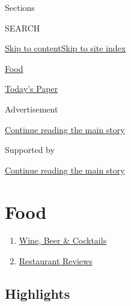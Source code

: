 Sections

SEARCH

\protect\hyperlink{site-content}{Skip to
content}\protect\hyperlink{site-index}{Skip to site index}

\href{https://www.nytimes3xbfgragh.onion/section/food}{Food}

\href{https://myaccount.nytimes3xbfgragh.onion/auth/login?response_type=cookie\&client_id=vi}{}

\href{https://www.nytimes3xbfgragh.onion/section/todayspaper}{Today's
Paper}

Advertisement

\protect\hyperlink{after-top}{Continue reading the main story}

Supported by

\protect\hyperlink{after-sponsor}{Continue reading the main story}

\hypertarget{food}{%
\section{Food}\label{food}}

\begin{enumerate}
\def\labelenumi{\arabic{enumi}.}
\tightlist
\item
  \href{/section/food/drinks}{Wine, Beer \& Cocktails}
\item
  \href{/reviews/dining}{Restaurant Reviews}
\end{enumerate}

\hypertarget{highlights}{%
\subsection{Highlights}\label{highlights}}

